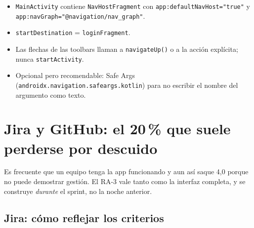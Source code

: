 \documentclass[11pt,letterpaper]{article}
\newcommand{\code}[1]{\texttt{\small #1}}
\begin{document}
\begin{itemize}[leftmargin=1.4em,itemsep=2pt]
  \item \code{MainActivity} contiene \code{NavHostFragment} con
        \code{app:defaultNavHost=\allowbreak{}"true"} y \code{app:navGraph=\allowbreak{}"@navigation/\allowbreak{}nav\_graph"}.
  \item \code{startDestination} = \code{loginFragment}.
  \item Las flechas de las toolbars llaman a \code{navigateUp(\allowbreak{})} o a la acci\'on
        expl\'icita; nunca \code{startActivity}.
  \item Opcional pero recomendable: Safe Args
        (\code{androidx.\allowbreak{}navigation.\allowbreak{}safeargs.\allowbreak{}kotlin}) para no escribir el nombre
        del argumento como texto.
\end{itemize}

\section{Jira y GitHub: el 20\,\% que suele perderse por descuido}

Es frecuente que un equipo tenga la app funcionando y aun as\'i saque 4,0 porque
no puede demostrar gesti\'on. El RA-3 vale tanto como la interfaz completa, y se
construye \emph{durante} el sprint, no la noche anterior.

\subsection{Jira: c\'omo reflejar los criterios}
\end{document}
